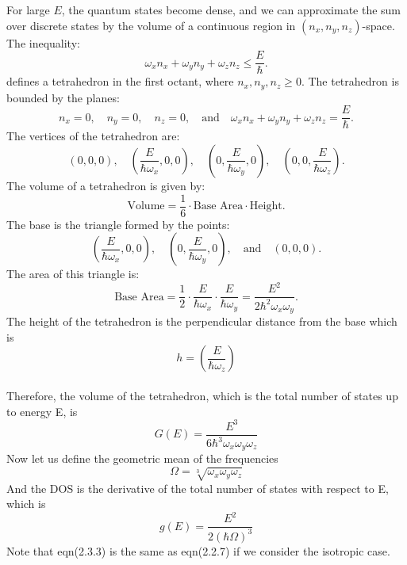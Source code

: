 \documentclass{article}
\numberwithin{equation}{section}
\numberwithin{equation}{subsection}
\begin{document}
For large \(E\), the quantum states become dense, and we can approximate the sum over discrete states by the volume of a continuous region in \((\mathit{n}_{\mathit{x}}, \mathit{n}_{\mathit{y}}, \mathit{n}_{\mathit{z}})\)-space. The inequality:
\[
\omega_{\mathit{x}} \mathit{n}_{\mathit{x}} + \omega_{\mathit{y}} \mathit{n}_{\mathit{y}} + \omega_{\mathit{z}} \mathit{n}_{\mathit{z}} \leq \frac{E}{\hbar}.
\]
defines a tetrahedron in the first octant, where \(\mathit{n}_{\mathit{x}}, \mathit{n}_{\mathit{y}}, \mathit{n}_{\mathit{z}} \geq 0\).
The tetrahedron is bounded by the planes:
\[
\mathit{n}_{\mathit{x}} = 0, \quad \mathit{n}_{\mathit{y}} = 0, \quad \mathit{n}_{\mathit{z}} = 0, \quad \text{and} \quad \omega_{\mathit{x}} \mathit{n}_{\mathit{x}} + \omega_{\mathit{y}} \mathit{n}_{\mathit{y}} + \omega_{\mathit{z}} \mathit{n}_{\mathit{z}} = \frac{E}{\hbar}.
\]
The vertices of the tetrahedron are:
\[
(0, 0, 0), \quad \left( \frac{E}{\hbar \omega_{\mathit{x}}}, 0, 0 \right), \quad \left( 0, \frac{E}{\hbar \omega_{\mathit{y}}}, 0 \right), \quad \left( 0, 0, \frac{E }{\hbar \omega_{\mathit{z}}} \right).
\]
The volume of a tetrahedron is given by:
\[
\text{Volume} = \frac{1}{6} \cdot \text{Base Area} \cdot \text{Height}.
\]
The base is the triangle formed by the points:
\[
\left( \frac{E }{\hbar \omega_{\mathit{x}}}, 0, 0 \right), \quad \left( 0, \frac{E }{\hbar \omega_{\mathit{y}}}, 0 \right), \quad \text{and} \quad (0, 0, 0).
\]
The area of this triangle is:
\[
\text{Base Area} = \frac{1}{2} \cdot \frac{E }{\hbar \omega_{\mathit{x}}} \cdot \frac{E}{\hbar \omega_{\mathit{y}}} = \frac{E^2}{2\hbar^2\omega_{\mathit{x}}\omega_{\mathit{y}}}.
\]
The height of the tetrahedron is the perpendicular distance from the base which is \[h = \left(\frac{E}{\hbar\omega_{\mathit{z}}}\right)\]\\
Therefore, the volume of the tetrahedron, which is the total number of states up to energy E, is
\begin{equation}
    G(E) = \frac{E^3}{6\hbar^3\omega_{\mathit{x}}\omega_{\mathit{y}}\omega_{\mathit{z}}}
\end{equation} 
Now let us define the geometric mean of the frequencies 
\begin{equation}
    \Omega = \sqrt[3]{\omega_{\mathit{x}}\omega_{\mathit{y}}\omega_{\mathit{z}}}
\end{equation}
And the DOS is the derivative of the total number of states with respect to E, which is
\begin{equation}
    g(\mathit{E}) = \frac{E^2}{2(\hbar\Omega)^3}
\end{equation} 
Note that eqn(2.3.3) is the same as eqn(2.2.7) if we consider the isotropic case.
\end{document}
